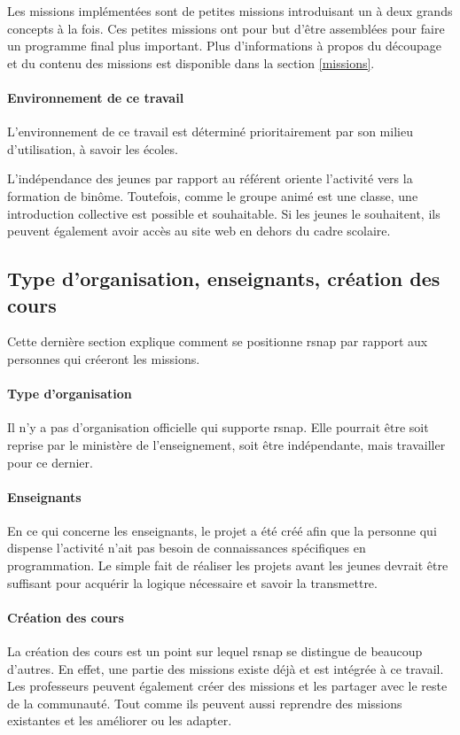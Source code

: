 Les \glspl{mission} implémentées sont de petites \glspl{mission} introduisant un à deux grands concepts à la fois. Ces petites \glspl{mission} ont pour but d'être assemblées pour faire un programme final plus important. Plus d'informations à propos du découpage et du contenu des \glspl{mission} est disponible dans la section \ref{missions}.

\paragraph{Environnement de ce travail}
L'environnement de ce travail est déterminé prioritairement par son milieu d'utilisation, à savoir les écoles.

L'indépendance des jeunes par rapport au référent oriente l'activité vers la formation de binôme. Toutefois, comme le groupe animé est une classe, une introduction collective est possible et souhaitable.
Si les jeunes le souhaitent, ils peuvent également avoir accès au site web en dehors du cadre scolaire.

\subsection{Type d'organisation, enseignants, création des cours}
Cette dernière section explique comment se positionne \gls{rsnap} par rapport aux personnes qui créeront les \glspl{mission}.

\paragraph{Type d'organisation}
Il n'y a pas d'organisation officielle qui supporte \gls{rsnap}. Elle pourrait être soit reprise par le ministère de l'enseignement, soit être indépendante, mais travailler pour ce dernier.

\paragraph{Enseignants}
En ce qui concerne les enseignants, le projet a été créé afin que la personne qui dispense l'activité n'ait pas besoin de connaissances spécifiques en programmation. Le simple fait de réaliser les projets avant les jeunes devrait être suffisant pour acquérir la logique nécessaire et savoir la transmettre.

\paragraph{Création des cours}
La création des cours est un point sur lequel \gls{rsnap} se distingue de beaucoup d'autres. En effet, une partie des \glspl{mission} existe déjà et est intégrée à ce travail. Les professeurs peuvent également créer des \glspl{mission} et les partager avec le reste de la communauté. Tout comme ils peuvent aussi reprendre des \glspl{mission} existantes et les améliorer ou les adapter.

